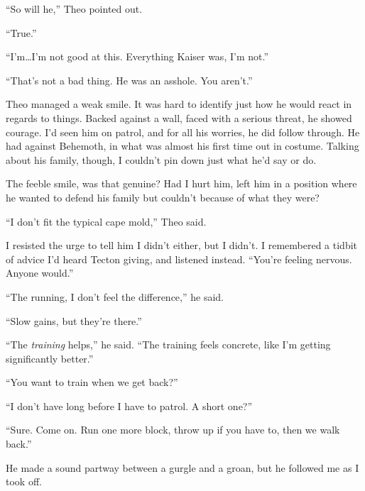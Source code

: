 ``So will he,'' Theo pointed out.



``True.''



``I'm\ldots I'm not good at this.  Everything Kaiser was, I'm not.''



``That's not a bad thing.  He was an asshole.  You aren't.''



Theo managed a weak smile.  It was hard to identify just how he would react in regards to things.  Backed against a wall, faced with a serious threat, he showed courage.  I'd seen him on patrol, and for all his worries, he did follow through.  He had against Behemoth, in what was almost his first time out in costume.  Talking about his family, though, I couldn't pin down just what he'd say or do.



The feeble smile, was that genuine?  Had I hurt him, left him in a position where he wanted to defend his family but couldn't because of what they were?



``I don't fit the typical cape mold,'' Theo said.



I resisted the urge to tell him I didn't either, but I didn't.  I remembered a tidbit of advice I'd heard Tecton giving, and listened instead.  ``You're feeling nervous.  Anyone would.''



``The running, I don't feel the difference,'' he said.



``Slow gains, but they're there.''



``The \emph{training} helps,'' he said.  ``The training feels concrete, like I'm getting significantly better.''



``You want to train when we get back?''



``I don't have long before I have to patrol.  A short one?''



``Sure.  Come on.  Run one more block, throw up if you have to, then we walk back.''



He made a sound partway between a gurgle and a groan, but he followed me as I took off.



